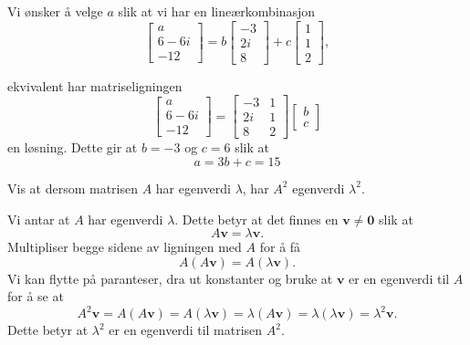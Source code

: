 \begin{losning}
Vi ønsker å velge $a$ slik at vi har en lineærkombinasjon
	\begin{equation*}
		\begin{bmatrix}
			a\\ 6 - 6i \\ -12
		\end{bmatrix}
		= b
		\begin{bmatrix}
			-3 \\ 2i \\ 8
		\end{bmatrix}
		+ c
		\begin{bmatrix}
			1 \\ 1 \\ 2
		\end{bmatrix},
	\end{equation*}
\end{losning}
ekvivalent har matriseligningen
\begin{equation*}
	\begin{bmatrix}
		a \\ 6-6i \\ -12
	\end{bmatrix}
	=
	\begin{bmatrix}
		-3 & 1 \\
		2i & 1 \\
		8 & 2
	\end{bmatrix}
	\begin{bmatrix}
		b \\ c
	\end{bmatrix}
\end{equation*}
en løsning. Dette gir at $b = -3$ og $c = 6$ slik at 
\begin{equation*}
	a = 3b + c = 15
\end{equation*}
\begin{oppgave}
Vis at dersom matrisen $A$ har egenverdi $\lambda$, har $A^2$ egenverdi $\lambda^2$.
\end{oppgave}


\begin{losning}
Vi antar at $A$ har egenverdi $\lambda$. Dette betyr at det finnes en $\mathbf{v}\not = \mathbf{0}$ slik at
\begin{equation*}
A \mathbf{v} = \lambda \mathbf{v}.
\end{equation*}
Multipliser begge sidene av ligningen med $A$ for å få
\begin{equation*}
A(A\mathbf{v}) = A(\lambda\mathbf{v}).
\end{equation*}
Vi kan flytte på paranteser, dra ut konstanter og bruke at $\mathbf{v}$ er en egenverdi til $A$ for å se at
\begin{equation*}
A^2\mathbf{v} = A(A\mathbf{v}) =A( \lambda \mathbf{v})=  \lambda (A \mathbf{v}) =\lambda (\lambda \mathbf{v})= \lambda^2\mathbf{v}.
\end{equation*}
Dette betyr at $\lambda^2$ er en egenverdi til matrisen $A^2$.
\end{losning}


